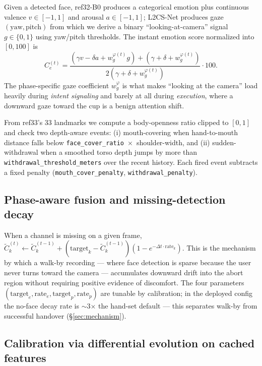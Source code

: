 \documentclass{article}
\newcommand{\code}[1]{\texttt{\small #1}}
\begin{document}
Given a detected face, ref32-B0 produces a categorical emotion plus continuous valence $v \in [-1, 1]$ and arousal $a \in [-1, 1]$; L2CS-Net produces gaze $(\text{yaw}, \text{pitch})$ from which we derive a binary ``looking-at-camera'' signal $g \in \{0, 1\}$ using yaw/pitch thresholds. The instant emotion score normalized into $[0, 100]$ is
\begin{equation}
C_e^{(t)} = \frac{(\gamma v - \delta a + w_g^{\varphi(t)} g) + (\gamma + \delta + w_g^{\varphi(t)})}{2(\gamma + \delta + w_g^{\varphi(t)})} \cdot 100.
\end{equation}
The phase-specific gaze coefficient $w_g^{\varphi}$ is what makes ``looking at the camera'' load heavily during \emph{intent signaling} and barely at all during \emph{execution}, where a downward gaze toward the cup is a benign attention shift.

From ref33's 33 landmarks we compute a body-openness ratio clipped to $[0, 1]$ and check two depth-aware events: (i) mouth-covering when hand-to-mouth distance falls below \code{face\_cover\_ratio}~$\times$~shoulder-width, and (ii) sudden-withdrawal when a smoothed torso depth jumps by more than \code{withdrawal\_threshold\_meters} over the recent history. Each fired event subtracts a fixed penalty (\code{mouth\_cover\_penalty}, \code{withdrawal\_penalty}).

\subsection{Phase-aware fusion and missing-detection decay}

When a channel is missing on a given frame, $\tilde{C}_k^{(t)} \leftarrow \tilde{C}_k^{(t-1)} + (\text{target}_k - \tilde{C}_k^{(t-1)}) (1 - e^{-\Delta t \cdot \text{rate}_k})$. This is the mechanism by which a walk-by recording --- where face detection is sparse because the user never turns toward the camera --- accumulates downward drift into the abort region without requiring positive evidence of discomfort. The four parameters $(\text{target}_e, \text{rate}_e, \text{target}_p, \text{rate}_p)$ are tunable by calibration; in the deployed config the no-face decay rate is $\sim$3$\times$ the hand-set default --- this separates walk-by from successful handover (\S\ref{sec:mechanism}).

\subsection{Calibration via differential evolution on cached features}
\end{document}
